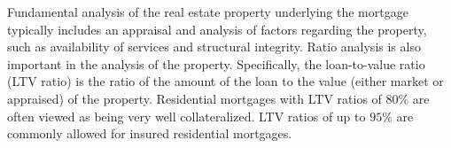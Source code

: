 \documentclass[11pt]{article}
\begin{document}
Fundamental analysis of the real estate property underlying the mortgage typically includes an appraisal and analysis of factors regarding the property, such as availability of services and structural integrity. Ratio analysis is also important in the analysis of the property. Specifically, the loan-to-value ratio (LTV ratio) is the ratio of the amount of the loan to the value (either market or appraised) of the property. Residential mortgages with LTV ratios of $80 \%$ are often viewed as being very well collateralized. LTV ratios of up to $95 \%$ are commonly allowed for insured residential mortgages.
\end{document}
